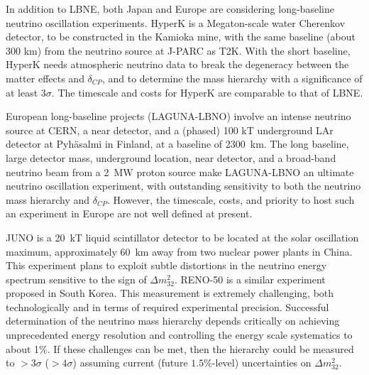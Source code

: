In addition to LBNE, both Japan and Europe are considering
long-baseline neutrino oscillation experiments. HyperK is a
Megaton-scale water Cherenkov detector, to be constructed in the
Kamioka mine, with the same baseline (about 300 km) from the neutrino
source at J-PARC as T2K. With the short baseline, HyperK needs
atmospheric neutrino data to break the degeneracy between the matter
effects and $\delta_{CP}$, and to determine the mass hierarchy with
a significance of at least $3\sigma$. The timescale and costs for
HyperK are comparable to that of LBNE. 

European long-baseline projects (LAGUNA-LBNO) involve an intense neutrino
source at CERN, a near detector, and a (phased) 
100 kT underground LAr detector at 
Pyh\"asalmi in Finland, at a baseline of 2300~km.  The long
baseline, large detector mass, underground location, near detector,
and a broad-band neutrino beam from a 2~MW proton source make LAGUNA-LBNO
an ultimate neutrino oscillation experiment, with outstanding
sensitivity to both the neutrino mass hierarchy and
$\delta_{CP}$. However, the timescale, costs, and priority to host such
an experiment in Europe are not well defined at present. 

JUNO is a 20~kT liquid scintillator detector to be located at
the solar oscillation maximum, approximately 60~km away from two
nuclear power plants in China. This experiment plans to exploit subtle
distortions in the neutrino energy spectrum sensitive to the sign of
$\Delta m^2_{32}$.  RENO-50 is a similar experiment proposed in South Korea.  
This measurement is extremely challenging, both technologically and in terms of required experimental precision.  
Successful determination of the neutrino mass hierarchy depends
critically on achieving unprecedented energy resolution
and controlling the energy scale systematics to about 1\%. 
If these challenges can be met, then the hierarchy could be measured to $>3\sigma$ ($>4\sigma$) assuming current (future $1.5\%$-level) uncertainties on $\Delta m^2_{32}$.  

